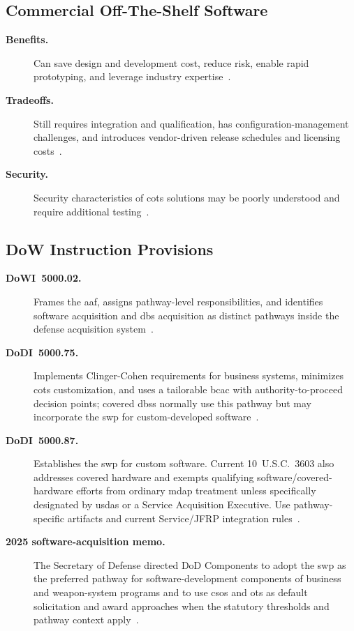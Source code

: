 \documentclass[../main.tex]{subfiles}
\begin{document}
\subsection{Commercial Off-The-Shelf Software}
\begin{description}
  \item[\textbf{Benefits.}] Can save design and development cost, reduce risk, enable rapid prototyping, and leverage industry expertise~\autocite{edo-3-4-1-software-acquisition-environment-2025}.
  \item[\textbf{Tradeoffs.}] Still requires integration and qualification, has configuration-management challenges, and introduces vendor-driven release schedules and licensing costs~\autocite{edo-3-4-1-software-acquisition-environment-2025}.
  \item[\textbf{Security.}] Security characteristics of \ac{cots} solutions may be poorly understood and require additional testing~\autocite{edo-3-4-1-software-acquisition-environment-2025}.
\end{description}

\subsection{DoW Instruction Provisions}
\begin{description}
  \item[\textbf{DoWI~5000.02.}] Frames the \ac{aaf}, assigns pathway-level responsibilities, and identifies software acquisition and \ac{dbs} acquisition as distinct pathways inside the defense acquisition system~\autocite{edo-3-4-1-software-acquisition-environment-2025,DoDI5000-02}.
  \item[\textbf{DoDI~5000.75.}] Implements Clinger-Cohen requirements for business systems, minimizes \ac{cots} customization, and uses a tailorable \ac{bcac} with authority-to-proceed decision points; covered \acp{dbs} normally use this pathway but may incorporate the \ac{swp} for custom-developed software~\autocite{edo-3-4-1-software-acquisition-environment-2025,DoDI5000-75,DoDI5000-87}.
  \item[\textbf{DoDI~5000.87.}] Establishes the \ac{swp} for custom software. Current 10~U.S.C.\ 3603 also addresses covered hardware and exempts qualifying software/covered-hardware efforts from ordinary \ac{mdap} treatment unless specifically designated by \ac{usdas} or a Service Acquisition Executive. Use pathway-specific artifacts and current Service/JFRP integration rules~\autocite{DoDI5000-87,USC-10-3603,USC-10-4201-2026}.
  \item[\textbf{2025 software-acquisition memo.}] The Secretary of Defense directed DoD Components to adopt the \ac{swp} as the preferred pathway for software-development components of business and weapon-system programs and to use \acp{cso} and \acp{ot} as default solicitation and award approaches when the statutory thresholds and pathway context apply~\autocite{SecDef-Software-Acq-2025}.
\end{description}
\end{document}
